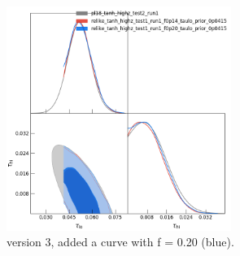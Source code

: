 \documentclass[prd,amsmath,amssymb,floatfix,superscriptaddress,nofootinbib]{revtex4-1}
\begin{document}
\begin{figure}
\includegraphics[width=0.65\textwidth]{cosmomc_kde/pl18_tanh_highz_test2_run1_vs_relike_tanh_highz_test1_run1_f0p14_and_f0p20_taulo_prior_0p0415_tri.png}
\caption{version 3, added a curve with f = 0.20 (blue).
}
\label{fig:}
\end{figure}



 

\end{document}
